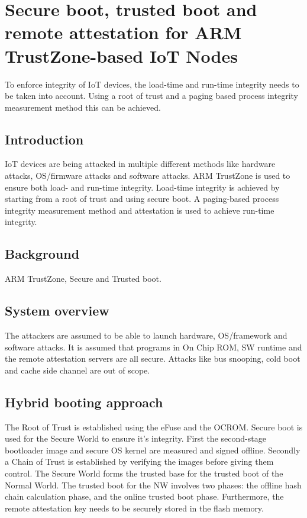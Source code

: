 \documentclass{article}
\begin{document}
\section{Secure boot, trusted boot and remote attestation for ARM TrustZone-based IoT Nodes}

To enforce integrity of IoT devices, the load-time and run-time integrity needs to be taken into account. Using a root of trust and a paging based process integrity measurement method this can be achieved.

\subsection{Introduction}

IoT devices are being attacked in multiple different methods like hardware attacks, OS/firmware attacks and software attacks. ARM TrustZone is used to ensure both load- and run-time integrity. Load-time integrity is achieved by starting from a root of trust and using secure boot. A paging-based process integrity measurement method and attestation is used to achieve run-time integrity. 

\subsection{Background}

ARM TrustZone, Secure and Trusted boot.

\subsection{System overview}

The attackers are assumed to be able to launch hardware, OS/framework and software attacks. It is assumed that programs in On Chip ROM, SW runtime and the remote attestation servers are all secure. Attacks like bus snooping, cold boot and cache side channel are out of scope.

\subsection{Hybrid booting approach} 

The Root of Trust is established using the eFuse and the OCROM. Secure boot is used for the Secure World to ensure it's integrity. First the second-stage bootloader image and secure OS kernel are measured and signed offline. Secondly a Chain of Trust is established by verifying the images before giving them control. The Secure World forms the trusted base for the trusted boot of the Normal World. The trusted boot for the NW involves two phases: the offline hash chain calculation phase, and the online trusted boot phase. Furthermore, the remote attestation key needs to be securely stored in the flash memory. 
\end{document}
